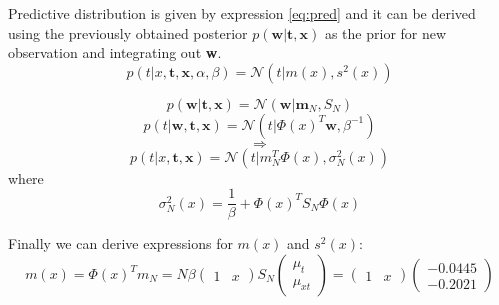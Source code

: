 \documentclass{article}
\begin{document}
Predictive distribution is given by expression \ref{eq:pred} and it can be derived using the previously obtained posterior $p(\textbf{w}|\textbf{t},\textbf{x})$ as the prior for new observation and integrating out \textbf{w}.
\begin{equation}
    \label{eq:pred}
    p(t|x,\textbf{t},\textbf{x},\alpha,\beta) = \mathcal{N}(t|m(x),s^2(x))
\end{equation}

\begin{equation}
    p(\textbf{w}|\textbf{t},\textbf{x}) = \mathcal{N}(\textbf{w}|\textbf{m}_N, S_N)
\end{equation}
\begin{equation}
    p(t|\textbf{w},\textbf{t},\textbf{x}) = \mathcal{N}(t|\Phi(x)^T\textbf{w}, \beta^{-1})
\end{equation}
$$\Rightarrow$$
\begin{equation}
    p(t|x,\textbf{t},\textbf{x}) = \mathcal{N}(t|m_N^T\Phi(x), \sigma_N^2(x))
\end{equation}
where
\begin{equation}
    \sigma_N^2(x) = \frac{1}{\beta} + \Phi(x)^TS_N\Phi(x)
\end{equation}

Finally we can derive expressions for $m(x)$ and $s^2(x)$:
\begin{equation}
    m(x) = \Phi(x)^Tm_N = N\beta
    \begin{pmatrix}
        1 & x
    \end{pmatrix}
    S_N
    \begin{pmatrix}
        \mu_t \\ \mu_{xt}
    \end{pmatrix}
    = 
    \begin{pmatrix}
        1 & x
    \end{pmatrix}
    \begin{pmatrix}
        -0.0445 \\
        -0.2021
    \end{pmatrix}
\end{equation}
\end{document}
